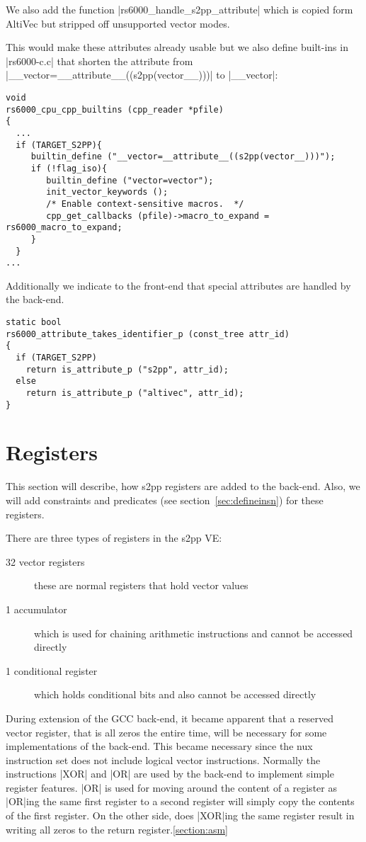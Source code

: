 We also add the function |rs6000_handle_s2pp_attribute| which is copied form AltiVec but stripped off unsupported vector modes.

This would make these attributes already usable but we also define built-ins in |rs6000-c.c| that shorten the attribute from |__vector=__attribute__((s2pp(vector__)))| to |__vector|:
\begin{lstlisting}
void
rs6000_cpu_cpp_builtins (cpp_reader *pfile)
{
  ...
  if (TARGET_S2PP){
     builtin_define ("__vector=__attribute__((s2pp(vector__)))");
     if (!flag_iso){
        builtin_define ("vector=vector");
        init_vector_keywords ();
        /* Enable context-sensitive macros.  */
        cpp_get_callbacks (pfile)->macro_to_expand = rs6000_macro_to_expand;
     }
  }
... 
\end{lstlisting}

Additionally we indicate to the front-end that special attributes are handled by the back-end.
\begin{lstlisting}
static bool
rs6000_attribute_takes_identifier_p (const_tree attr_id)
{
  if (TARGET_S2PP)
    return is_attribute_p ("s2pp", attr_id);
  else
    return is_attribute_p ("altivec", attr_id);
}
\end{lstlisting}

\section{Registers}
\label{section:register}
This section will describe, how s2pp registers are added to the back-end.
Also, we will add constraints and predicates (see section~\ref{sec:defineinsn}) for these registers.

There are three types of registers in the s2pp VE:
\begin{description}
    \item[32 vector registers] these are normal registers that hold vector values
    \item[1 accumulator] which is used for chaining arithmetic instructions and cannot be accessed directly
    \item[1 conditional register] which holds conditional bits and also cannot be accessed directly
\end{description}

During extension of the GCC back-end, it became apparent that a reserved vector register, that is all zeros the entire time, will be necessary for some implementations of the back-end.
This became necessary since the nux instruction set does not include logical vector instructions.
Normally the instructions |XOR| and |OR| are used by the back-end to implement simple register features.
|OR| is used for moving around the content of a register as |OR|ing the same first register to a second register will simply copy the contents of the first register.
On the other side, does |XOR|ing the same register result in writing all zeros to the return register.\ref{section:asm}

